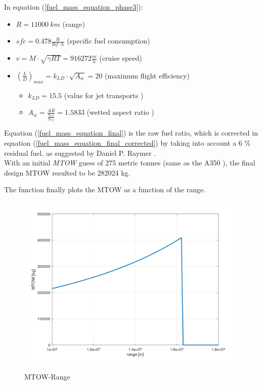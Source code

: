 \documentclass{article}
\begin{document}
In equation (\ref{fuel_mass_equation_phase3}):

\begin{itemize}
    \item $R = 11000 \ km$ (range)
    \item $sfc = 0.478 \frac{lb}{lbf \cdot h} $ (specific fuel consumption)
    \item $v = M \cdot \sqrt{\gamma RT} = 916272 \frac{m}{h} $ (cruise speed)
    \item $\left(\frac{L}{D}\right)_{max}  = k_{LD} \cdot \sqrt{A_w} = 20$ (maximum flight efficiency)
    \begin{itemize}
        \item $k_{LD} = 15.5$ (value for jet transports \autocite{Raymer_Daniel})
        \item $A_w = \frac{AR}{\frac{S_{wet}}{S_{ref}}} = 1.5833$ (wetted aspect ratio \autocite{Raymer_Daniel})
    \end{itemize}
\end{itemize}

Equation (\ref{fuel_mass_equation_final}) is the raw fuel ratio, which is corrected in equation (\ref{fuel_mass_equation_final_corrected})
by taking into account a 6 \% residual fuel, as suggested by Daniel P. Raymer \autocite{Raymer_Daniel}.\\ 

With an initial \textit{MTOW} guess of 275 metric tonnes (same as the A350 \autocite{Airbus_A350-900}), the 
final design MTOW resulted to be 282024 kg.

\clearpage 

The function finally plots the MTOW as a function of the range.\\


\begin{figure}[h!]
    \centering
    \includegraphics[width=\textwidth]{Sources/Plots_and_Pictures/MTOW_range.png}
    \label{MTOW_Range}
    \caption{MTOW-Range}
\end{figure}
\end{document}
